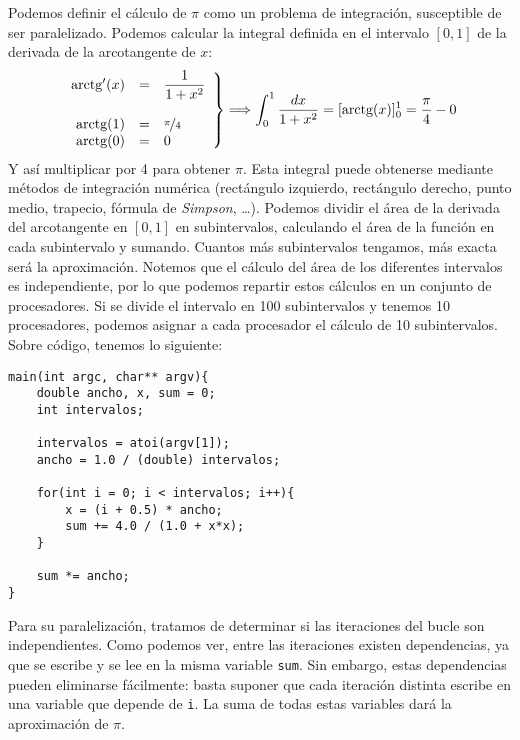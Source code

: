 Podemos definir el cálculo de $\pi$ como un problema de integración, susceptible de ser paralelizado. Podemos calcular la integral definida en el intervalo $[0,1]$ de la derivada de la arcotangente de $x$:
\begin{equation*}
    \left.\begin{array}{rcl}
        \text{arctg}'(x) & = & \dfrac{1}{1+x^2} \\
                  & & \\
        \text{arctg}(1) & = & \nicefrac{\pi}{4} \\
        \text{arctg}(0) & = & 0 
    \end{array}\right\} \Longrightarrow \int_{0}^{1} \dfrac{dx}{1+x^2} = [\text{arctg}(x)]_0^1 = \dfrac{\pi}{4} - 0
\end{equation*}
Y así multiplicar por 4 para obtener $\pi$. Esta integral puede obtenerse mediante métodos de integración numérica (rectángulo izquierdo, rectángulo derecho, punto medio, trapecio, fórmula de \emph{Simpson}, \ldots). Podemos dividir el área de la derivada del arcotangente en $[0,1]$ en subintervalos, calculando el área de la función en cada subintervalo y sumando. Cuantos más subintervalos tengamos, más exacta será la aproximación.
Notemos que el cálculo del área de los diferentes intervalos es independiente, por lo que podemos repartir estos cálculos en un conjunto de procesadores. Si se divide el intervalo en 100 subintervalos y tenemos 10 procesadores, podemos asignar a cada procesador el cálculo de 10 subintervalos. Sobre código, tenemos lo siguiente:
    \begin{verbatim}
main(int argc, char** argv){
    double ancho, x, sum = 0;
    int intervalos;

    intervalos = atoi(argv[1]);
    ancho = 1.0 / (double) intervalos;

    for(int i = 0; i < intervalos; i++){
        x = (i + 0.5) * ancho;
        sum += 4.0 / (1.0 + x*x);
    }

    sum *= ancho;
}
    \end{verbatim}
Para su paralelización, tratamos de determinar si las iteraciones del bucle son independientes. Como podemos ver, entre las iteraciones existen dependencias, ya que se escribe y se lee en la misma variable \verb|sum|. Sin embargo, estas dependencias pueden eliminarse fácilmente: basta suponer que cada iteración distinta escribe en una variable que depende de \verb|i|. La suma de todas estas variables dará la aproximación de $\pi$. 

